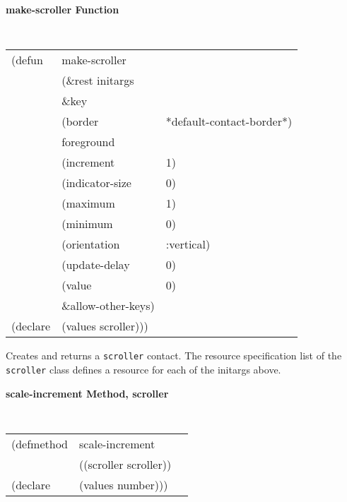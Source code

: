 {\samepage
{\large {\bf make-scroller \hfill Function}} 
\begin{flushright} \parbox[t]{6.125in}{
\tt
\begin{tabular}{lll}
\raggedright
(defun & make-scroller \\
       & (\&rest initargs \\
       & \&key  \\
       & (border                & *default-contact-border*) \\ 
       & foreground \\
       & (increment             & 1) \\ 
       & (indicator-size        & 0) \\ 
       & (maximum               & 1) \\ 
       & (minimum               & 0) \\ 
       & (orientation           & :vertical) \\ 
       & (update-delay          & 0) \\
       & (value                 & 0) \\  
       &   \&allow-other-keys) \\
(declare & (values   scroller)))
\end{tabular}
\rm

}\end{flushright}}

\begin{flushright} \parbox[t]{6.125in}{
Creates and returns a {\tt scroller} contact.
The resource specification list of the {\tt scroller} class defines
a resource for each of the initargs above.


}\end{flushright}





{\samepage  
{\large {\bf scale-increment \hfill Method, scroller}}
\begin{flushright} \parbox[t]{6.125in}{
\tt
\begin{tabular}{lll}
\raggedright
(defmethod & scale-increment & \\
& ((scroller  scroller)) \\
(declare & (values number)))
\end{tabular}
\rm

}\end{flushright}}

